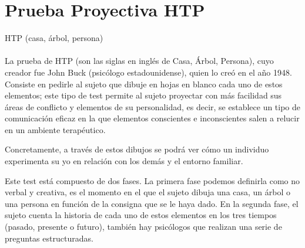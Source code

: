 \section{Prueba Proyectiva HTP}

HTP (casa, árbol, persona)
\\\\
La prueba de HTP (son las siglas en inglés de Casa, Árbol, Persona), cuyo creador fue John Buck (psicólogo estadounidense), quien lo creó en el año 1948. Consiste en pedirle al sujeto que dibuje en hojas en blanco cada uno de estos elementos; este tipo de test permite al sujeto proyectar con más facilidad sus áreas de conflicto y elementos de su personalidad, es decir, se establece un tipo de comunicación eficaz en la que elementos conscientes e inconscientes salen a relucir en un ambiente terapéutico.

Concretamente, a través de estos dibujos se podrá ver cómo un individuo experimenta su yo en relación con los demás y el entorno familiar.

Este test está compuesto de dos fases. La primera fase podemos definirla como no verbal y creativa, es el momento en el que el sujeto dibuja una casa, un árbol o una persona en función de la consigna que se le haya dado. En la segunda fase, el sujeto cuenta la historia de cada uno de estos elementos en los tres tiempos (pasado, presente o futuro), también hay psicólogos que realizan una serie de preguntas estructuradas. \cite{htp}
\\\\\\\\\\